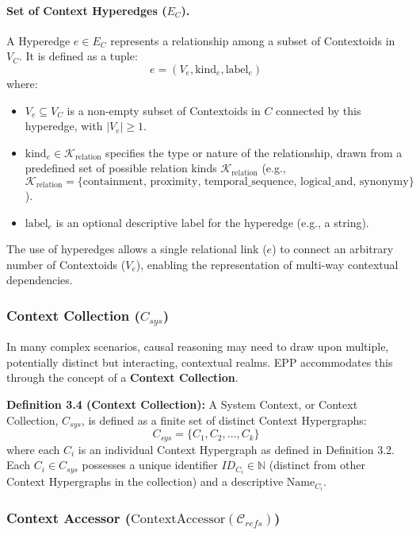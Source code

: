 \paragraph*{Set of Context Hyperedges (\(E_C\)).}
A Hyperedge \( e \in E_C \) represents a relationship among a subset of Contextoids in \(V_C\). It is defined as a tuple:
\[ e = (V_e, \text{kind}_e, \text{label}_e) \]
where:
\begin{itemize}
    \setlength\itemsep{0em} %
    \item \( V_e \subseteq V_C \) is a non-empty subset of Contextoids in \(C\) connected by this hyperedge, with \(|V_e| \ge 1\).
    \item \( \text{kind}_e \in \mathcal{K}_{\text{relation}} \) specifies the type or nature of the relationship, drawn from a predefined set of possible relation kinds \(\mathcal{K}_{\text{relation}}\) (e.g., \(\mathcal{K}_{\text{relation}} = \{\text{containment, proximity, temporal\_sequence, logical\_and, synonymy}\}\)).
    \item \( \text{label}_e \) is an optional descriptive label for the hyperedge (e.g., a string).
\end{itemize}
The use of hyperedges allows a single relational link (\(e\)) to connect an arbitrary number of Contextoids (\(V_e\)), enabling the representation of multi-way contextual dependencies.

\subsubsection[Context Collection (C\_sys)]{Context Collection (\(C_{sys}\))}
\label{ssec:context_collection_formal}

In many complex scenarios, causal reasoning may need to draw upon multiple, potentially distinct but interacting, contextual realms. EPP accommodates this through the concept of a \textbf{Context Collection}.

\noindent\textbf{Definition 3.4 (Context Collection):} A System Context, or Context Collection, \(C_{sys}\), is defined as a finite set of distinct Context Hypergraphs:  \[ C_{sys} = \{C_1, C_2, \dots, C_k\} \] where each \( C_i \) is an individual Context Hypergraph as defined in Definition 3.2. Each \(C_i \in C_{sys}\) possesses a unique identifier \(ID_{C_i} \in \mathbb{N}\) (distinct from other Context Hypergraphs in the collection) and a descriptive \(\text{Name}_{C_i}\).

\subsubsection[Context Accessor (ContextAccessor C\_refs)]{Context Accessor (\(\text{ContextAccessor}(\mathcal{C}_{refs})\))}
\label{ssec:context_accessor_formal}

